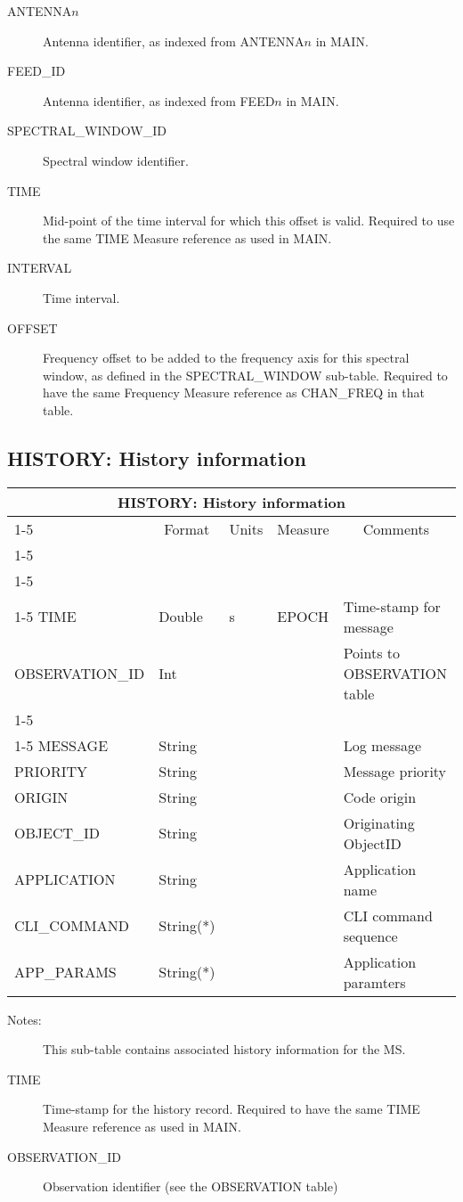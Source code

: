 \documentclass{article}
\newcommand{\defline}[1]{\cline{1-5}
\multicolumn{5}{|l|}{#1} \\
\cline{1-5}}
\newcommand{\definetable}[2]
{
	\vfill\newpage
	\subsection{#1}
        \vspace{0.15in}
        \small
	\begin{tabular}{|l|p{1.25in}|l|p{.9in}|p{1.4in}|}
	\hline
	\multicolumn{5}{|c|}{\bf #1}\\ 
	\cline{1-5}
        \multicolumn{1}{|c|}{Name}&\multicolumn{1}{|c|}{Format}&
        \multicolumn{1}{|c|}{Units}&\multicolumn{1}{|c|}{Measure}&
        \multicolumn{1}{|c|}{Comments}\\
        \cline{1-5}
        #2
        \hline
	\end{tabular}
}
\begin{document}
\begin{itemize}
\begin{description}
\item[ANTENNA$n$] Antenna identifier, as indexed from ANTENNA$n$ in MAIN.

\item[FEED\_ID] Antenna identifier, as indexed from FEED$n$ in MAIN.

\item[SPECTRAL\_WINDOW\_ID] Spectral window identifier.

\item[TIME] Mid-point of the time interval for which this offset is valid.
Required to use the same TIME Measure reference as used in MAIN.

\item[INTERVAL] Time interval.

\item[OFFSET] Frequency offset to be added to the frequency axis for
this spectral window, as defined in the SPECTRAL\_WINDOW
sub-table. Required to have the same Frequency Measure reference as
CHAN\_FREQ in that table.

\end{description}

\definetable{HISTORY: History information}{
\defline{\bf Columns}
\defline{\em Key}
TIME & Double & s &              EPOCH  & Time-stamp for message\\
OBSERVATION\_ID  & Int   &          &        & Points to OBSERVATION table\\
\defline{\em Data}  
MESSAGE  & String &    &      & Log message\\
PRIORITY & String & & & Message priority\\
ORIGIN   & String & & & Code origin\\
OBJECT\_ID & String & & & Originating ObjectID \\
APPLICATION & String & & & Application name\\
CLI\_COMMAND & String(*) & & & CLI command sequence \\
APP\_PARAMS   & String(*) & & & Application paramters\\
}
\begin{description}

\item[Notes:] This sub-table contains associated history information
for the MS.

\item[TIME] Time-stamp for the history record. Required to have the
same TIME Measure reference as used in MAIN.

\item[OBSERVATION\_ID] Observation identifier (see the OBSERVATION table)


\end{description}
\end{itemize}
\end{document}
